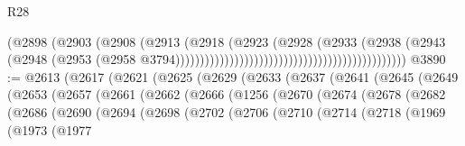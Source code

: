 \begin{lexlean}{R28}
\begin{coremodule}
                                                                        (@2898
                                                                          (@2903
                                                                            (@2908
                                                                              (@2913
                                                                                (@2918
                                                                                  (@2923
                                                                                    (@2928
                                                                                      (@2933
                                                                                        (@2938
                                                                                          (@2943
                                                                                            (@2948
                                                                                              (@2953
                                                                                                (@2958
                                                                                                  @3794)))))))))))))))))))))))))))))))))))))))))))))))
@3890 := @2613
    (@2617
      (@2621
        (@2625
          (@2629
            (@2633
              (@2637
                (@2641
                  (@2645
                    (@2649
                      (@2653
                        (@2657
                          (@2661
                            (@2662
                              (@2666
                                (@1256
                                  (@2670
                                    (@2674
                                      (@2678
                                        (@2682
                                          (@2686
                                            (@2690
                                              (@2694
                                                (@2698
                                                  (@2702
                                                    (@2706
                                                      (@2710
                                                        (@2714
                                                          (@2718
                                                            (@1969
                                                              (@1973
                                                                (@1977

\end{coremodule}
\end{lexlean}
